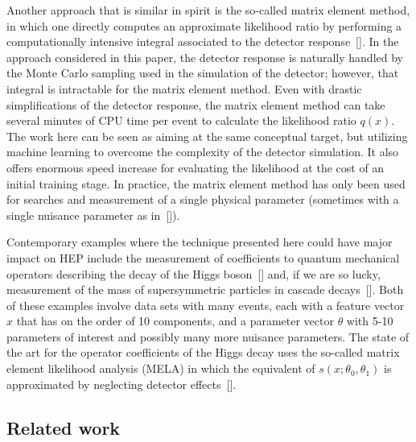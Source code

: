 \documentclass[aoas,preprint]{imsart}
\newcommand{\citek}[1]{[\cite{#1}]}
\numberwithin{equation}{section}
\theoremstyle{plain}
\begin{document}
Another approach that is similar in spirit is the so-called matrix element method, in which one  directly computes an approximate likelihood ratio by performing a computationally intensive integral associated to the detector response~\citek{Volobouev:2011vb}. In the approach considered in this paper, the detector response is naturally handled by the Monte Carlo sampling used in the simulation of the detector; however, that integral is intractable for the matrix element method. Even with drastic simplifications of the detector response, the matrix element method can take several minutes of CPU time per event to calculate the likelihood ratio $q(x)$. The work here can be seen as aiming at the same conceptual target, but utilizing machine learning to overcome the complexity of the detector simulation. It also offers enormous speed increase for evaluating the likelihood at the cost of an initial training stage. In practice, the matrix element method has only been used for searches and measurement of a single physical parameter (sometimes with a single nuisance parameter as in~\citek{Aaltonen:2010yz}).

Contemporary examples where the technique presented here could have major impact on HEP include the measurement of coefficients to quantum mechanical operators describing the decay of the Higgs boson~\citek{Chen:2014pia} and, if we are so lucky, measurement of the mass of supersymmetric particles in cascade decays~\citek{Allanach:2000kt}.  Both of these examples involve data sets with many events, each with a feature vector $x$ that has on the order of 10 components, and a parameter vector $\theta$ with 5-10 parameters of interest and possibly many more nuisance parameters. 
The state of the art for the operator coefficients of the Higgs decay uses the so-called matrix element likelihood analysis (MELA) in which the equivalent of $s(x; \theta_0, \theta_1)$ is approximated by neglecting detector effects~\citek{Bolognesi:2012mm}. 

\subsection{Related work}\label{S:Related}

\end{document}
